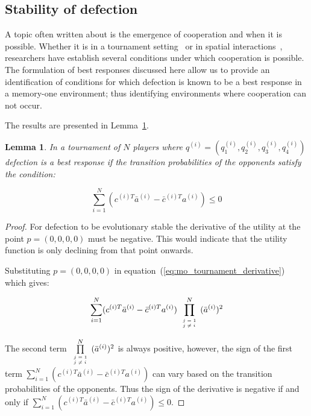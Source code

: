 \documentclass[10pt]{article}
\newtheorem{lemma}[theorem]{Lemma}
\begin{document}
\subsection{Stability of defection}

A topic often written about is the emergence of cooperation and when it is
possible. Whether it is in a tournament setting~\cite{Axelrod1981} or in spatial
interactions~\cite{ohtsuki2006}, researchers
have establish several conditions under which cooperation is possible.
The formulation of best responses discussed here allow us to 
provide an identification of conditions for which defection is known to be a best
response in a memory-one environment; thus identifying environments where cooperation
can not occur.

The results are presented in Lemma~\ref{lemma:stability_of_defection}.

\begin{lemma}\label{lemma:stability_of_defection}
    In a tournament of \(N\) players where \(q^{(i)} = (q_{1}^{(i)}, q_{2}^{(i)}, q_{3}^{(i)}, q_{4}^{(i)})\)
    defection is a best response if the transition probabilities of the
    opponents satisfy the condition:

    \begin{equation}
        \sum_{i=1} ^ N (c^{(i)T} \bar{a}^{(i)} - \bar{c}^{(i)T} a^{(i)}) \leq 0
    \end{equation}
\end{lemma}

\begin{proof}
    For defection to be evolutionary stable the derivative of the utility
    at the point \(p = (0, 0, 0, 0)\) must be negative. This would indicate that
    the utility function is only declining from that point onwards.

    Substituting \(p = (0, 0, 0, 0)\) in
    equation~(\ref{eq:mo_tournament_derivative}) which gives:

    \begin{equation}
    \sum_{i=1} ^ N (c^{(i)T} \bar{a}^{(i)} - \bar{c}^{(i)T} a^{(i)})
    \prod\limits_{\tiny\begin{array}{l} j=1 \\ j \neq i \end{array}} ^ N (\bar{a}^{(i)})^2
    \end{equation}
    
    The second term \(\prod\limits_{\tiny\begin{array}{l} j=1 \\ j \neq i
    \end{array}} ^ N (\bar{a}^{(i)})^2\) is always positive, however, the sign of the
    first term \(\sum_{i=1} ^ N (c^{(i)T} \bar{a}^{(i)} - \bar{c}^{(i)T} a^{(i)})\)
    can vary based on the transition probabilities of the opponents. Thus the
    sign of the derivative is negative if and only if
    \(\sum_{i=1} ^ N (c^{(i)T} \bar{a}^{(i)} - \bar{c}^{(i)T} a^{(i)}) \leq 0\).
\end{proof}
\end{document}
